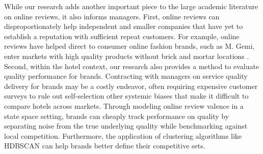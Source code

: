 \documentclass[12pt, leqno]{article}
\begin{document}
While our research adds another important piece to the large academic literature on online reviews, it also informs managers. First, online reviews can disproportionately help independent and smaller companies that have yet to establish a reputation with sufficient repeat customers. For example, online reviews have helped direct to consumer online fashion brands, such as M. Gemi, enter markets with high quality products without brick and mortar locations . Second, within the hotel context, our research also provides a method to evaluate quality performance for brands. Contracting with managers on service quality delivery for brands may be a costly endeavor, often requiring expensive customer surveys to rule out self-selection other systemic biases that make it difficult to compare hotels across markets. Through modeling online review valence in a state space setting, brands can cheaply track performance on quality by separating noise from the true underlying quality while benchmarking against local competition. Furthermore, the application of clustering algorithms like HDBSCAN can help brands better define their competitive sets. 
\end{document}
